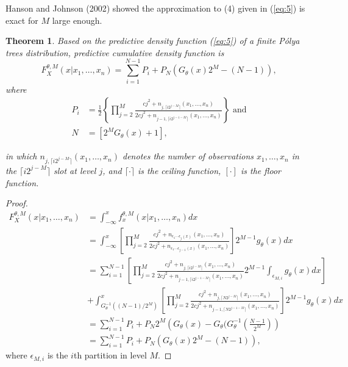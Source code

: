 \documentclass[12pt]{article}
\newtheorem{thm}{Theorem}[subsection]
\newcommand{\polya}{P\'{o}lya}
\begin{document}
Hanson and Johnson (2002) showed the approximation to (4) given in
(\ref{eq:5}) is exact for $M$ large enough.

\begin{thm}
Based on the predictive density function (\ref{eq:5}) of a
finite \polya{} trees distribution, 
predictive cumulative density function is 
\begin{equation}
\label{eq:6}
F^{\theta,M}_X(x|x_1, \ldots, x_n) = \sum_{i=1}^{N-1} P_{i} + P_N
\left( G_{\theta}(x)2^M -(N-1) \right),
\end{equation}
where
\begin{align*}
P_i &= \frac{1}{2} \left\{\prod_{j=2}^M \frac{cj^2 + n_{j,\lceil i2^{j-M}
  \rceil}(x_1, \ldots, x_n)}{2cj^2 + n_{j-1,\lceil
  i2^{j-1-M} \rceil}(x_{1 },\ldots, x_n)} \right\} \mbox{ and}\\
N & = \left[ 2^{M } G_{\theta}(x)   +1\right],
\end{align*}

in which $n_{j,\lceil i2^{j-M}
  \rceil}(x_1, \ldots, x_n)$ denotes the number of observations $x_1,
\ldots, x_n$ in the $\lceil i2^{j-M}
  \rceil$ slot at level $j$, and $\lceil \cdot
  \rceil$ is the ceiling function, $[ \cdot ]$ is the floor function. 
\end{thm}

\begin{proof}
\begin{align*}
F^{\theta,M}_X(x| x_1, \ldots, x_n) & = \int_{-\infty}^x
f_x^{\theta,M} (x|x_1, \ldots, x_n) dx \\
& = \int_{-\infty}^x \left[
  \prod_{j=2}^M \frac{cj^2 + n_{\epsilon_1 \cdots \epsilon_j(x) }(x_1 , \ldots, x_n)}{2cj^2
  + n_{\epsilon_1 \cdots \epsilon_{j-1}(x)}(x_1, \ldots, x_n)}
\right]2^{M-1} g_\theta(x) dx \\
& =  \sum_{i=1}^{N-1} \left[ \prod_{j=2}^M \frac{cj^2 + n_{j, \lceil i2^{j-M}
  \rceil}(x_1,
    \ldots, x_n)}{2cj^2 + n_{j-1, \lceil i2^{j-1-M}
  \rceil}(x_1, \ldots, x_n)} 2^{M-1}
  \int_{\epsilon_{M,i}} g_{\theta}(x) dx \right] \\
&+ 
\int_{G^{-1}_{\theta}((N-1)/2^M)}^x \left[ \prod_{j=2}^M \frac{cj^2 + n_{j, \lceil N2^{j-M}
  \rceil}(x_1,
    \ldots, x_n)}{2cj^2 + n_{j-1, \lceil N2^{j-1-M}
  \rceil}(x_1, \ldots, x_n)}\right] 2^{M-1}
   g_{\theta}(x) dx \\
& = \sum_{i=1}^{N-1} P_i + P_N 2^M \left( G_{\theta}(x) -
  G_{\theta}(G_{\theta}^{-1}\left( \frac{N-1}{2^M} \right)\right)\\
& = \sum_{i=1}^{N-1}P_i + P_N \left( G_{\theta}(x) 2^M - (N-1) \right),
\end{align*}
where $\epsilon_{M,i}$ is the $i$th partition in level $M$. 
\end{proof}
\end{document}
